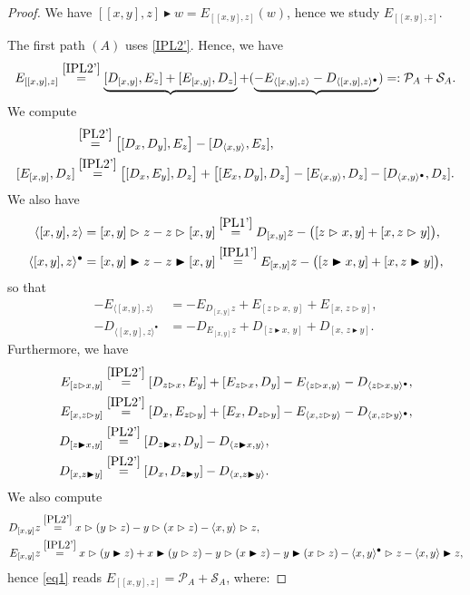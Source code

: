 \documentclass[10pt]{article}
\theoremstyle{definition}
\newcommand{\wt}{\vartriangleright}
\newcommand{\bt}{\blacktriangleright}
\newcommand{\ab}[2]{\langle #1,#2\rangle}
\newcommand{\abd}[2]{\langle #1,#2\rangle^{\bullet}}
\begin{document}
\begin{proof}
We have $[[x,y],z]\bt w = E_{[[x,y],z]}(w)$, hence we study $E_{[[x,y],z]}$. \medskip

The first path $(A)$ uses \eqref{IPL2'}. Hence, we have
\begin{equation}\label{eq1}
E_{[[x,y],z]}\overset{\eqref{IPL2'}}{=}\underbrace{[D_{[x,y]},E_z]+[E_{[x,y]},D_z]}+(\underbrace{
   -E_{\ab{[x,y]}{z}}-D_{\abd{[x,y]}{z}}})=:\mathcal{P}_A+\mathcal{S}_A .
\end{equation}
We compute
\begin{align*}
[D_{[x,y]},E_z] &\overset{\eqref{PL2'}}{=} \bigl[[D_x,D_y],E_z\bigr]-[D_{\ab{x}{y}},E_z],\\
[E_{[x,y]},D_z] &\overset{\eqref{IPL2'}}{=} \bigl[[D_x,E_y],D_z\bigr]+\bigl[[E_x,D_y],D_z\bigr]-[E_{\ab{x}{y}},D_z]-[D_{\abd{x}{y}},D_z].
\end{align*}
We also have
\begin{align*}
\ab{[x,y]}{z}  &= [x,y]\wt z-z\wt[x,y]\overset{\eqref{PL1'}}{=} D_{[x,y]}z-\bigl([z\wt x,y]+[x,z\wt y]\bigr),\\
\abd{[x,y]}{z} &= [x,y]\bt z-z\bt[x,y]\overset{\eqref{IPL1'}}{=} E_{[x,y]}z-\bigl([z\bt x,y]+[x,z\bt y]\bigr),
\end{align*}
so that 
\begin{align*}
  -E_{\ab{[x,y]}{z}}  &= -E_{D_{[x,y]}z}+E_{[z\wt x,\,y]}+E_{[x,\,z\wt y]},\\
  -D_{\abd{[x,y]}{z}} &= -D_{E_{[x,y]}z}+D_{[z\bt x,\,y]}+D_{[x,\,z\bt y]}.
\end{align*}
Furthermore, we have
\begin{align*}
E_{[z\wt x,y]} &\overset{\eqref{IPL2'}}{=} [D_{z\wt x},E_y]+[E_{z\wt x},D_y]-E_{\ab{z\wt x}{y}}-D_{\abd{z\wt x}{y}},\\
E_{[x,z\wt y]} &\overset{\eqref{IPL2'}}{=}[D_x,E_{z\wt y}]+[E_x,D_{z\wt y}]-E_{\ab{x}{z\wt y}}-D_{\abd{x}{z\wt y}},\\
D_{[z\bt x,y]} &\overset{\eqref{PL2'}}{=} [D_{z\bt x},D_y]-D_{\ab{z\bt x}{y}},\\
D_{[x,z\bt y]} &\overset{\eqref{PL2'}}{=} [D_x,D_{z\bt y}]-D_{\ab{x}{z\bt y}}.
\end{align*}
We also compute
\begin{align*}
D_{[x,y]}z &\overset{\eqref{PL2'}}{=} x\wt(y\wt z)-y\wt(x\wt z)-\ab{x}{y}\wt z,\\
E_{[x,y]}z &\overset{\eqref{IPL2'}}{=} x\wt(y\bt z)+x\bt(y\wt z)-y\wt(x\bt z)-y\bt(x\wt z)-\abd{x}{y}\wt z-\ab{x}{y}\bt z,
\end{align*}
hence \eqref{eq1} reads $E_{[[x,y],z]}=\mathcal{P}_A+\mathcal{S}_A$, where:

\end{proof}
\end{document}
